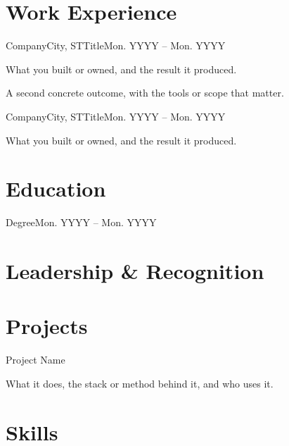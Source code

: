 \documentclass{techresume}
\begin{document}
\makeheader

\section{Work Experience}

\begin{job}{Company}{City, ST}{Title}{Mon. YYYY -- Mon. YYYY}
  \item What you built or owned, and the result it produced.
  \item A second concrete outcome, with the tools or scope that matter.
\end{job}

\begin{job}{Company}{City, ST}{Title}{Mon. YYYY -- Mon. YYYY}
  \item What you built or owned, and the result it produced.
\end{job}

\section{Education}

       {Degree}{Mon. YYYY -- Mon. YYYY}

\section{Leadership \& Recognition}


\section{Projects}

\begin{project}{Project Name}
  \item What it does, the stack or method behind it, and who uses it.
\end{project}

\section{Skills}

\end{document}
